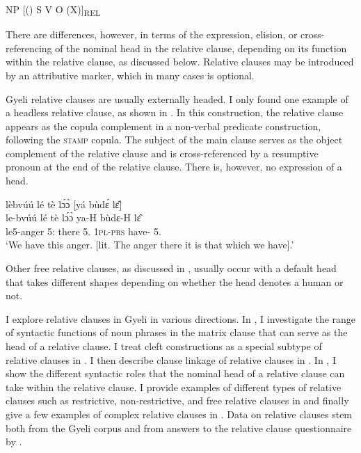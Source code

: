 \begin{center}
NP [({\ATT}) S V O (X)]\textsubscript{REL}
\end{center} 

\noindent There are differences, however, in terms of the expression, elision, or cross-ref\-er\-encing of the nominal head in the relative clause, depending on its function within the relative clause, as discussed below.  Relative clauses may be introduced by an attributive marker, which in many cases is optional. 

Gyeli relative clauses are usually externally headed. I only found one example of a headless relative clause, as shown in . In this construction, the relative clause appears as the copula complement in a non-verbal predicate construction, following the \textsc{stamp} copula. The subject of the main clause serves as the object complement of the relative clause and is cross-referenced by a resumptive pronoun at the end of the relative clause. There is, however, no expression of a head.


\ea\label{REL3} 
  \glll  lèbvúú  lé tè lɔ́ɔ̀ [yá bùdɛ́ lɛ̂]\textsubscript{{\REL}} \\
         le-bvúú  lé tè lɔ́ɔ̀ {\db}ya-H bùdɛ-H lɛ̂ \\
         le5-anger 5:{\ATT} there 5.{\COP} {\db}1\textsc{pl}-\textsc{prs} have-{\R} 5.{\OBJ}    \\
    \trans `We have this anger. [lit. The anger there it is that which we have].'
\z

\noindent Other free relative clauses, as discussed in , usually occur with a default head that takes different shapes depending on whether the head denotes a human or not.


I explore relative clauses in Gyeli in various directions. In , I investigate the range of syntactic functions of noun phrases in the matrix clause that can serve as the head of a relative clause. I treat cleft constructions as a special subtype of relative clauses in . I then describe clause linkage of relative clauses in . In , I show the different syntactic roles that the nominal head of a relative clause can take within the relative clause. I provide examples of different types of relative clauses such as restrictive, non-restrictive, and free relative clauses in  and finally give a few examples of complex relative clauses in . Data on relative clauses stem both from the Gyeli corpus and from answers to the relative clause questionnaire by \citet{downing2010}.


